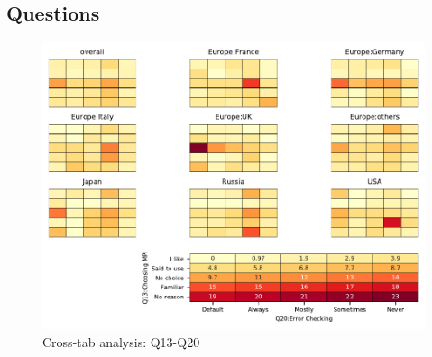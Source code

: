 
\subsection{Questions}


\begin{figure}
\begin{center}
\includegraphics[width=12cm]{../pdfs/Q13-Q20.pdf}
\caption{Cross-tab analysis: Q13-Q20}
\label{fig:Q13-Q20}
\end{center}
\end{figure}
